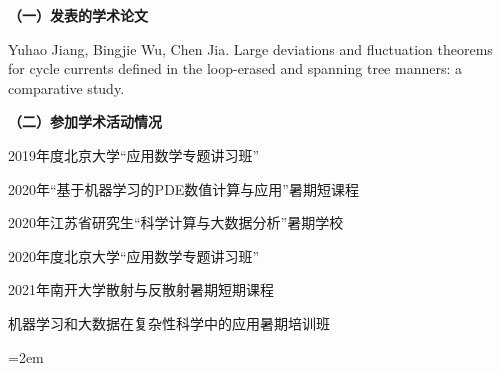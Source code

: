 
\setlength{\parindent}{0em}
\textbf{（一）发表的学术论文}
\begin{publist}
\item Yuhao Jiang, Bingjie Wu, Chen Jia. Large deviations and fluctuation theorems for cycle currents defined in the loop-erased and spanning tree manners: a comparative study.
\end{publist}

\textbf{（二）参加学术活动情况}
\begin{publist}
\item 2019年度北京大学“应用数学专题讲习班”
\item 2020年“基于机器学习的PDE数值计算与应用”暑期短课程
\item 2020年江苏省研究生“科学计算与大数据分析”暑期学校
\item 2020年度北京大学“应用数学专题讲习班”
\item 2021年南开大学散射与反散射暑期短期课程
\item 机器学习和大数据在复杂性科学中的应用暑期培训班
\end{publist}
\vfill
{}\hangindent=2em\noindent

\setlength{\parindent}{2em}
